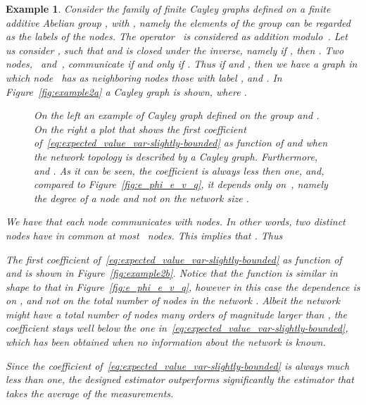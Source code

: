 \documentclass[a4paper,notitlepage,onecolumn]{article}
\newtheorem{example}[theorem]{Example}
\numberwithin{equation}{section}
\begin{document}
\begin{example}
Consider the family of finite Cayley graphs defined on a finite
additive Abelian group , with
, namely the elements of the
group can be regarded as the labels of the nodes. The operator~
is considered as addition modulo~. Let us consider , such that  and  is closed under the inverse, namely
if , then . Two nodes, ~and~, communicate
if and only if . Thus if  and , then we
have a graph in which node~ has as neighboring nodes those with
label ,  and . In
Figure~\ref{fig:example2a} a Cayley graph is shown, where .

\begin{figure}
    \centering
    \hspace*{2cm}
    \caption{On the left an example of Cayley graph 
    defined on the group  and . On
    the right a plot that shows the first coefficient
    of~\eqref{eq:expected_value_var-slightly-bounded} as function of  and  when the network topology is described by a Cayley graph.
    Furthermore,  and . As it can be seen, the coefficient is always less then one, and,
    compared to Figure~\ref{fig:e_phi_e_v_q}, it depends only on~, namely the degree of a node and not on the network size .}
    \label{fig:example2}
\end{figure}


We have that each node communicates with  nodes. In
other words, two distinct nodes have in common at most~
nodes. This implies that . Thus

The first coefficient
of~\eqref{eq:expected_value_var-slightly-bounded} as function of
 and  is shown in Figure~\ref{fig:example2b}.
Notice that the function is similar in shape to that in
Figure~\ref{fig:e_phi_e_v_q}, however in this case the dependence
is on , and not on the total number of nodes in the network
. Albeit the network might have a total number of nodes many
orders of magnitude larger than , the coefficient stays well
below the one in~\eqref{eq:expected_value_var-slightly-bounded},
which has been obtained when no information about the network is
known.

Since the coefficient
of~\eqref{eq:expected_value_var-slightly-bounded} is always much
less than one, the designed estimator outperforms significantly
the estimator that takes the average of the measurements.
\end{example}
\end{document}

